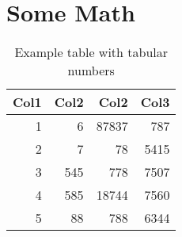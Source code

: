 \documentclass[11pt, a4paper, oneside]{article}
\title{\docsubject}
\author{\docauthor}
\begin{document}
\maketitle

\blinddocument
\clearpage

\section{Some Math}
\blindmathpaper
\begin{table}[t]
    \centering
    \renewcommand{\arraystretch}{1.2}
    \setlength{\tabcolsep}{16pt}
    \caption[Example table]{Example table with tabular numbers}
    \begin{tabular}{rrrr}
        \toprule
        \textbf{Col1} & \textbf{Col2} & \textbf{Col2} & \textbf{Col3} \\
        \midrule
        1             & 6             & 87837         & 787           \\
        2             & 7             & 78            & 5415          \\
        3             & 545           & 778           & 7507          \\
        4             & 585           & 18744         & 7560          \\
        5             & 88            & 788           & 6344          \\
        \bottomrule
    \end{tabular}
    \label{table:example}
\end{table}
\end{document}
